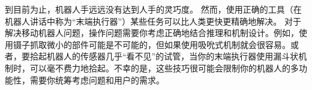 到目前为止，机器人手远远没有达到人手的灵巧度。 然而，使用正确的工具（在机器人讲话中称为“末端执行器”）某些任务可以比人类更快更精确地解决。 对于解决移动机器人问题，操作问题需要你考虑正确地结合推理和机制设计。例如，使用镊子抓取微小的部件可能是不可能的，但如果使用吸吮式机制就会很容易。或者，要拾起机器人的传感器几乎“看不见”的试管，当你的末端执行器使用漏斗状机制时，可以毫不费力地拾起。不幸的是，这些技巧很可能会限制你的机器人的多功能性，需要你统筹考虑问题和用户的需求。




